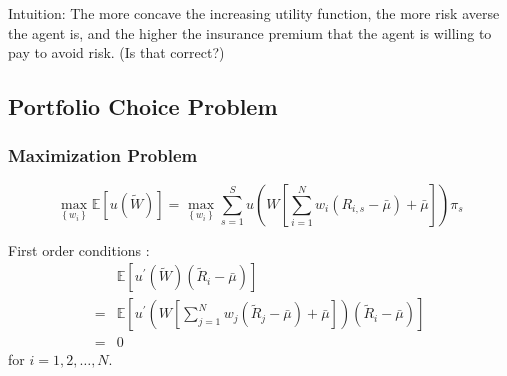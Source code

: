 \documentclass[10pt]{article}
\begin{document}
Intuition: 
The more concave the increasing utility function, the more risk averse the agent is, and the higher the insurance premium that the agent is willing to pay to avoid risk.
(Is that correct?)

\subsection{Portfolio Choice Problem}

\subsubsection{Maximization Problem}

$$
\max _{\left\{w_i\right\}} \mathbb{E}[u(\tilde{W})]=\max _{\left\{w_i\right\}}\sum_{s=1}^S u\left(W\left[\sum_{i=1}^N w_i\left(R_{i, s}-\bar{\mu}\right)+\bar{\mu}\right]\right) \pi_s
$$

First order conditions :
$$
\begin{aligned}
& \mathbb{E}\left[u^{\prime}(\tilde{W})\left(\tilde{R}_i-\bar{\mu}\right)\right]  \\
= & \mathbb{E}\left[u^{\prime}\left(W\left[\sum_{j=1}^N w_j\left(\tilde{R}_j-\bar{\mu}\right)+\bar{\mu}\right]\right)\left(\tilde{R}_i-\bar{\mu}\right)\right] \\
= & 0
\end{aligned}
$$
for $i=1,2, \ldots, N$.
\end{document}
